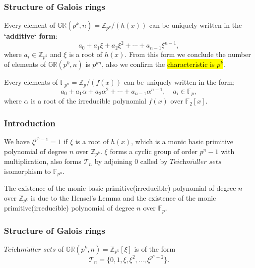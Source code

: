 \documentclass[
    aspectratio=169,                   %
]{beamer}
\renewcommand{\Bbb}{\mathbb}
\newcommand{\Z}{\mathbb{Z}}
\newcommand{\GR}{\mathbb{GR}}
\newcommand{\F}{\mathbb{F}}
\newcommand{\teich}{\textit{Teichm$\ddot{u}$ller sets}}
\begin{document}
    \begin{frame}
        \frametitle{Structure of Galois rings}
        Every element of $\GR(p^k,n)=\Z_{p^k}/(h(x))$ can be uniquely written in the \textbf{`additive` form}:
        \begin{equation}\label{additive_form}
            a_0+a_1\xi+a_2\xi^2+\cdots+a_{n-1}\xi^{n-1},
        \end{equation}
        where $a_i\in\Bbb Z_{p^k}$ and $ \xi $ is a root of $ h(x) $. 
        From this form we conclude the number of elements of $\GR(p^k,n)$ is $p^{kn}$, 
        also we confirm the \hl{characteristic is $ p^k $}.

        \begin{remark}
            Every elements of $ \F_{p^n}=\Z_{p}/(f(x)) $ can be uniquely written in the form;
            \[a_0+a_1\alpha+a_2\alpha^2+\cdots+a_{n-1}\alpha^{n-1},\quad a_i\in\F_p,\]
            where $ \alpha $  is a root of the irreducible polynomial $ f(x) $ over $ \F_2[x] $. 
        \end{remark}
    \end{frame}
    \begin{frame}
        \frametitle{Introduction}
        We have $\xi^{p^n-1}=1$ if $\xi$ is a root of $h(x)$, 
        which is a monic basic primitive polynomial of degree $ n $ over $ \Z_{p^k} $.
        $ \xi $ forms a cyclic group of order $ p^n-1$ with multiplication, 
        also forms $ \mathcal{T}_n $ by adjoining $0$ called by $\teich$ isomorphism to $\Bbb F_{p^n}$.
    \begin{remark}
        The existence of the monic basic primitive(irreducible) polynomial of degree $ n $ over $ \Z_{p^k} $ is 
        due to the Hensel's Lemma and the existence of the monic primitive(irreducible) polynomial of degree $ n $ 
        over $ \F_p $. 
    \end{remark}

    \end{frame}
    \begin{frame}
        \frametitle{Structure of Galois rings}
    
        \begin{definition}[$ \teich $]
            $ \teich $ of $ \GR(p^k,n)=\Z_{p^k}[\xi] $ is of the form 
            \[\mathcal{T}_n=\{0,1,\xi,\xi^2,\dots,\xi^{p^n-2}\}.\]
        \end{definition}
    
    \end{frame}
\end{document}
